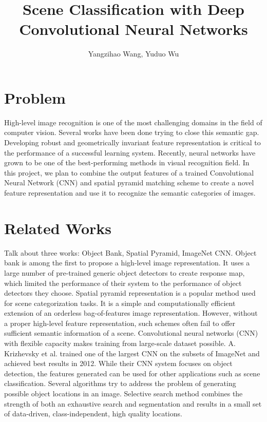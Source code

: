 \documentclass[letterpaper,twocolumn,10pt]{article}
\title{Scene Classification with Deep Convolutional Neural Networks}
\author{Yangzihao Wang, Yuduo Wu}
\date{} %
\begin{document}
\maketitle

\section{Problem}
High-level image recognition is one of the most challenging domains in the
field of computer vision. Several works have been done trying to close this
semantic gap. Developing robust and geometrically invariant feature
representation is critical to the performance of a successful learning system.
Recently, neural networks have grown to be one of the best-performing methods
in visual recognition field. In this project, we plan to combine the output
features of a trained Convolutional Neural Network (CNN) and spatial pyramid
matching scheme to create a novel feature representation and use it to
recognize the semantic categories of images.

\section{Related Works}
Talk about three works: Object Bank, Spatial Pyramid, ImageNet CNN.  Object
bank\cite{OB} is among the first to propose a high-level image representation.
It uses a large number of pre-trained generic object detectors to create
response map, which limited the performance of their system to the performance
of object detectors they choose. Spatial pyramid representation\cite{SPM} is
a popular method used for scene categorization tasks. It is a simple and
computationally efficient extension of an orderless bag-of-features image
representation. However, without a proper high-level feature representation,
such schemes often fail to offer sufficient semantic information of a scene.
Convolutional neural networks (CNN) with flexible capacity makes training from
large-scale dataset possible. A. Krizhevsky et al.\cite{CNN} trained one of the
largest CNN on the subsets of ImageNet and achieved best results in 2012. While
their CNN system focuses on object detection, the features generated can be
used for other applications such as scene classification. Several algorithms
try to address the problem of generating possible object locations in an image.
Selective search method combines the strength of both an exhaustive search and
segmentation and results in a small set of data-driven, class-independent, high
quality locations.
\end{document}
